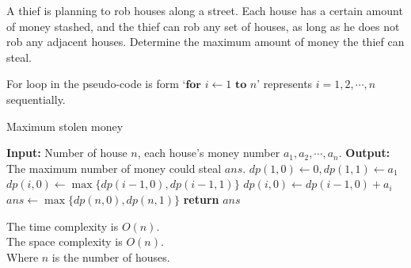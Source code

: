 \problem{}
A thief is planning to rob houses along a street. Each house has a certain amount of money stashed, and the thief can rob any set of houses, as long as he does not rob any adjacent houses.  Determine the maximum amount of money the thief can steal.

\solution{}








For loop in the pseudo-code is form `$\textbf{for } i \gets 1 \textbf{ to } n$' represents $i=1,2,\cdots,n$ sequentially.
\begin{algorithm}
    \caption{Maximum stolen money}\label{alg:problem-3}
    \begin{algorithmic}[1]
    \State \textbf{Input:} Number of house $n$, each house's money number $a_1, a_2, \cdots, a_n$. 
    \State \textbf{Output:} The maximum number of money could steal $ans$.
    \State $dp(1,0) \gets 0, dp(1,1)\gets a_1$
        \State $dp(i,0) \gets \max\{dp(i-1,0),dp(i-1,1)\}$
        \State $dp(i,0) \gets dp(i-1,0)+a_i$
    \EndFor
    \State $ans \gets \max\{dp(n,0),dp(n,1)\}$
    \State \textbf{return} $ans$
    \end{algorithmic}
\end{algorithm}

The time complexity is $O(n)$.\\
The space complexity is $O(n)$.\\
Where $n$ is the number of houses.\\

\newpage